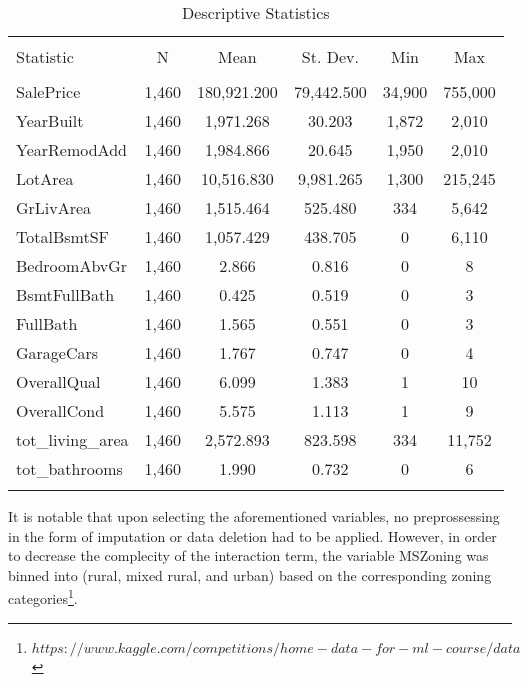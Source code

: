 \documentclass{article}
\begin{document}
\begin{table}[!htbp] \centering 
  \caption{Descriptive Statistics} 
  \label{} 
\begin{tabular}{@{\extracolsep{5pt}}lccccc} 
\\[-1.8ex]\hline 
\hline \\[-1.8ex] 
Statistic & \multicolumn{1}{c}{N} & \multicolumn{1}{c}{Mean} & \multicolumn{1}{c}{St. Dev.} & \multicolumn{1}{c}{Min} & \multicolumn{1}{c}{Max} \\ 
\hline \\[-1.8ex] 
SalePrice & 1,460 & 180,921.200 & 79,442.500 & 34,900 & 755,000 \\ 
YearBuilt & 1,460 & 1,971.268 & 30.203 & 1,872 & 2,010 \\ 
YearRemodAdd & 1,460 & 1,984.866 & 20.645 & 1,950 & 2,010 \\ 
LotArea & 1,460 & 10,516.830 & 9,981.265 & 1,300 & 215,245 \\ 
GrLivArea & 1,460 & 1,515.464 & 525.480 & 334 & 5,642 \\ 
TotalBsmtSF & 1,460 & 1,057.429 & 438.705 & 0 & 6,110 \\ 
BedroomAbvGr & 1,460 & 2.866 & 0.816 & 0 & 8 \\ 
BsmtFullBath & 1,460 & 0.425 & 0.519 & 0 & 3 \\ 
FullBath & 1,460 & 1.565 & 0.551 & 0 & 3 \\ 
GarageCars & 1,460 & 1.767 & 0.747 & 0 & 4 \\ 
OverallQual & 1,460 & 6.099 & 1.383 & 1 & 10 \\ 
OverallCond & 1,460 & 5.575 & 1.113 & 1 & 9 \\ 
tot\_living\_area & 1,460 & 2,572.893 & 823.598 & 334 & 11,752 \\ 
tot\_bathrooms & 1,460 & 1.990 & 0.732 & 0 & 6 \\ 
\hline \\[-1.8ex] 
\end{tabular} 
\end{table} 


It is notable that upon selecting the aforementioned variables, no preprossessing in the form of imputation or data deletion had to be applied. However, in order to decrease the complecity of the interaction term, the variable MSZoning was binned into (rural, mixed rural, and urban) based on the corresponding zoning categories\footnote{$https://www.kaggle.com/competitions/home-data-for-ml-course/data$}.
\end{document}
